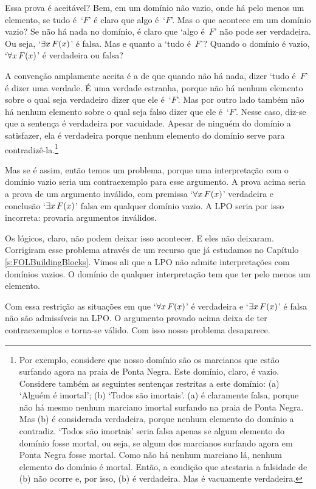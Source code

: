 Essa prova é aceitável? Bem, em um domínio não vazio, onde há pelo menos um elemento, se tudo é~`$F$'  é claro que algo é~`$F$'. Mas o que acontece em um domínio vazio? Se não há nada no domínio, é claro que `algo é~$F$' não pode ser verdadeira. Ou seja, `$\exists x\,\mathord{F}(x)$' é falsa. Mas e quanto a `tudo é~$F$'?  Quando o domínio é vazio, `$\forall x\,\mathord{F}(x)$' é verdadeira ou falsa?

A convenção amplamente aceita é a de que quando não há nada, dizer `tudo é~$F$' é dizer uma verdade. É uma verdade estranha, porque não há nenhum elemento sobre o qual seja verdadeiro dizer que ele é~`$F$'. Mas por outro lado também não há nenhum elemento sobre o qual seja falso dizer que ele é~`$F$'. Nesse caso, diz-se que a sentença é verdadeira por vacuidade. Apesar de ninguém do domínio a satisfazer, ela é verdadeira porque nenhum elemento do domínio serve para contradizê-la.\footnote{Por exemplo, considere que nosso domínio são os marcianos que estão surfando agora na praia de Ponta Negra. Este domínio, claro, é vazio. Considere também as seguintes sentenças restritas a este domínio: (a) `Alguém é imortal'; (b) `Todos são imortais'. (a) é claramente falsa, porque não há mesmo nenhum marciano imortal surfando na praia de Ponta Negra. Mas (b) é considerada verdadeira, porque nenhum elemento do domínio a contradiz. `Todos são imortais' seria falsa apenas se algum elemento do domínio fosse mortal, ou seja, se algum dos marcianos surfando agora em Ponta Negra fosse mortal. Como não há nenhum marciano lá, nenhum elemento do domínio é mortal. Então, a condição que atestaria a falsidade de (b) não ocorre e, por isso, (b) é verdadeira. Mas é vacuamente verdadeira.}

Mas se é assim, então temos um problema, porque uma interpretação com o domínio vazio seria um contraexemplo para esse argumento. A prova acima seria a prova de um argumento inválido, com premissa `$\forall x\,\mathord{F}(x)$' verdadeira e conclusão `$\exists x\,\mathord{F}(x)$' falsa em qualquer domínio vazio. A LPO seria por isso incorreta: provaria argumentos inválidos.

Os lógicos, claro, não podem deixar isso acontecer. E eles não deixaram. Corrigiram esse problema através de um recurso que já estudamos no Capítulo \ref{s:FOLBuildingBlocks}. Vimos ali que a LPO não admite interpretações com domínios vazios. O domínio de qualquer interpretação tem que ter pelo menos um elemento.

Com essa restrição as situações em que `$\forall x\,\mathord{F}(x)$' é verdadeira e `$\exists x\,\mathord{F}(x)$' é falsa não são admissíveis na LPO. O argumento provado acima deixa de ter contraexemplos e torna-se válido. Com isso nosso problema desaparece.

